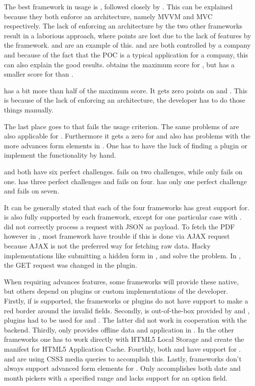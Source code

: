 \documentclass[a4paper]{artikel3}
\begin{document}
The best framework in usage is \kendob{}, followed closely by \sta{}.
This can be explained because they both enforce an architecture, namely MVVM and MVC respectively.
The lack of enforcing an architecture by the two other frameworks result in a laborious approach, where points are lost due to the lack of features by the framework.
 and  are an example of this.
\kendob{} and \sta{} are both controlled by a company and because of the fact that the POC is a typical application for a company, this can also explain the good results.
\kendob{} obtains the maximum score for , but has a smaller score for  than \sta.

\jqma{} has a bit more than half of the maximum score.
It gets zero points on  and .
This is because of the lack of enforcing an architecture, the developer has to do those things manually. 

The last place goes to \lungo{} that fails the usage criterion.
The same problems of \jqma{} are also applicable for \lungo{}.
Furthermore it gets a zero for  and also has problems with the more advances form elements in .
One has to have the luck of finding a plugin or implement the functionality by hand.

\kendob{} and \sta{} both have six perfect challenges.
\kendob{} fails on two challenges, while \sta{} only fails on one.
\jqm{} has three perfect challenges and fails on four.
\lungo{} has only one perfect challenge and fails on seven.

It can be generally stated that each of the four frameworks has great support for.
 is also fully supported by each framework, except for one particular case with \lungo{}.
\quo{} did not correctly process a request with JSON as payload.
To fetch the PDF however in , most framework have trouble if this is done via AJAX request because AJAX is not the preferred way for fetching raw data.
Hacky implementations like submitting a hidden form in \jqma{}, \kendob{} and \lungo{} solve the problem.
In \sta{}, the GET request was changed in the plugin.

When requiring advances features, some frameworks will provide these native, but others depend on plugins or custom implementations of the developer.
Firstly, if  is supported, the frameworks or plugins do not have support to make a red border around the invalid fields.
Secondly,  is out-of-the-box provided by \kendob{} and \jqma{}, plugins had to be used for \lungo{} and \sta{}.
The latter did not work in cooperation with the backend.
Thirdly, only \st{} provides offline data and application in .
In the other frameworks one has to work directly with HTML5 Local Storage and create the manifest for HTML5 Application Cache.
Fourthly, both \sta{} and \kendob{} have support for .
\jqma{} and \lungo{} are using CSS3 media queries to accomplish this.
Lastly, frameworks don't always support advanced form elements for .
Only \kendob{} accomplishes both date and month pickers with a specified range and \lungo{} lacks support for an option field.
\end{document}

